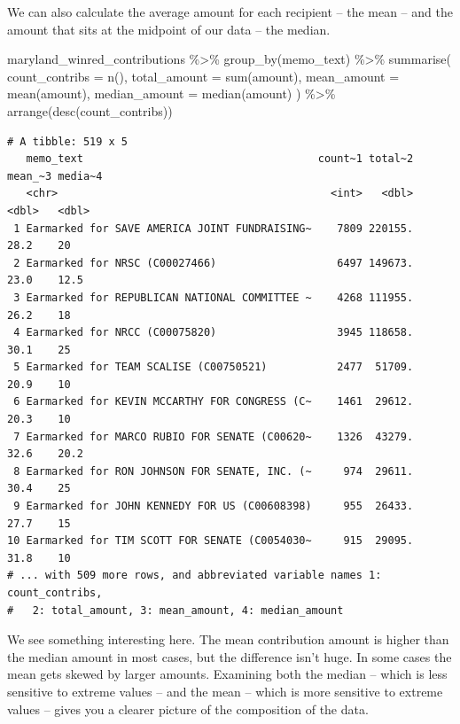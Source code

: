 \documentclass[
  letterpaper,
  DIV=11,
  numbers=noendperiod]{scrreprt}
\newenvironment{Shaded}{\begin{snugshade}}{\end{snugshade}}
\newcommand{\AttributeTok}[1]{\textcolor[rgb]{0.40,0.45,0.13}{#1}}
\newcommand{\FunctionTok}[1]{\textcolor[rgb]{0.28,0.35,0.67}{#1}}
\newcommand{\NormalTok}[1]{\textcolor[rgb]{0.00,0.23,0.31}{#1}}
\newcommand{\SpecialCharTok}[1]{\textcolor[rgb]{0.37,0.37,0.37}{#1}}
\begin{document}
We can also calculate the average amount for each recipient -- the mean
-- and the amount that sits at the midpoint of our data -- the median.

\begin{Shaded}
\begin{Highlighting}[]
\NormalTok{maryland\_winred\_contributions }\SpecialCharTok{\%\textgreater{}\%}
  \FunctionTok{group\_by}\NormalTok{(memo\_text) }\SpecialCharTok{\%\textgreater{}\%}
  \FunctionTok{summarise}\NormalTok{(}
    \AttributeTok{count\_contribs =} \FunctionTok{n}\NormalTok{(),}
    \AttributeTok{total\_amount =} \FunctionTok{sum}\NormalTok{(amount),}
    \AttributeTok{mean\_amount =} \FunctionTok{mean}\NormalTok{(amount),}
    \AttributeTok{median\_amount =} \FunctionTok{median}\NormalTok{(amount)}
\NormalTok{  ) }\SpecialCharTok{\%\textgreater{}\%}
  \FunctionTok{arrange}\NormalTok{(}\FunctionTok{desc}\NormalTok{(count\_contribs))}
\end{Highlighting}
\end{Shaded}

\begin{verbatim}
# A tibble: 519 x 5
   memo_text                                     count~1 total~2 mean_~3 media~4
   <chr>                                           <int>   <dbl>   <dbl>   <dbl>
 1 Earmarked for SAVE AMERICA JOINT FUNDRAISING~    7809 220155.    28.2    20  
 2 Earmarked for NRSC (C00027466)                   6497 149673.    23.0    12.5
 3 Earmarked for REPUBLICAN NATIONAL COMMITTEE ~    4268 111955.    26.2    18  
 4 Earmarked for NRCC (C00075820)                   3945 118658.    30.1    25  
 5 Earmarked for TEAM SCALISE (C00750521)           2477  51709.    20.9    10  
 6 Earmarked for KEVIN MCCARTHY FOR CONGRESS (C~    1461  29612.    20.3    10  
 7 Earmarked for MARCO RUBIO FOR SENATE (C00620~    1326  43279.    32.6    20.2
 8 Earmarked for RON JOHNSON FOR SENATE, INC. (~     974  29611.    30.4    25  
 9 Earmarked for JOHN KENNEDY FOR US (C00608398)     955  26433.    27.7    15  
10 Earmarked for TIM SCOTT FOR SENATE (C0054030~     915  29095.    31.8    10  
# ... with 509 more rows, and abbreviated variable names 1: count_contribs,
#   2: total_amount, 3: mean_amount, 4: median_amount
\end{verbatim}

We see something interesting here. The mean contribution amount is
higher than the median amount in most cases, but the difference isn't
huge. In some cases the mean gets skewed by larger amounts. Examining
both the median -- which is less sensitive to extreme values -- and the
mean -- which is more sensitive to extreme values -- gives you a clearer
picture of the composition of the data.
\end{document}
